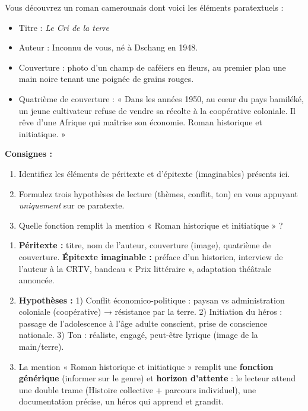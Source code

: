 \documentclass[11pt]{article}
\begin{document}
\begin{exercice}
Vous découvrez un roman camerounais dont voici les éléments paratextuels :
\begin{itemize}
\item Titre : \emph{Le Cri de la terre}
\item Auteur : Inconnu de vous, né à Dschang en 1948.
\item Couverture : photo d'un champ de caféiers en fleurs, au premier plan une main noire tenant une poignée de grains rouges.
\item Quatrième de couverture : « Dans les années 1950, au cœur du pays bamiléké, un jeune cultivateur refuse de vendre sa récolte à la coopérative coloniale. Il rêve d'une Afrique qui maîtrise son économie. Roman historique et initiatique. »
\end{itemize}
\textbf{Consignes :}
\begin{enumerate}
\item Identifiez les éléments de péritexte et d'épitexte (imaginables) présents ici.
\item Formulez trois hypothèses de lecture (thèmes, conflit, ton) en vous appuyant \emph{uniquement} sur ce paratexte.
\item Quelle fonction remplit la mention « Roman historique et initiatique » ?
\end{enumerate}
\end{exercice}

\begin{corrige}[Exercice n°1]
\begin{enumerate}
\item \textbf{Péritexte :} titre, nom de l'auteur, couverture (image), quatrième de couverture. \textbf{Épitexte imaginable :} préface d'un historien, interview de l'auteur à la CRTV, bandeau « Prix littéraire », adaptation théâtrale annoncée.
\item \textbf{Hypothèses :} 1) Conflit économico-politique : paysan vs administration coloniale (coopérative) → résistance par la terre. 2) Initiation du héros : passage de l'adolescence à l'âge adulte conscient, prise de conscience nationale. 3) Ton : réaliste, engagé, peut-être lyrique (image de la main/terre).
\item La mention « Roman historique et initiatique » remplit une \textbf{fonction générique} (informer sur le genre) et \textbf{horizon d'attente} : le lecteur attend une double trame (Histoire collective + parcours individuel), une documentation précise, un héros qui apprend et grandit.
\end{enumerate}
\end{corrige}
\end{document}
